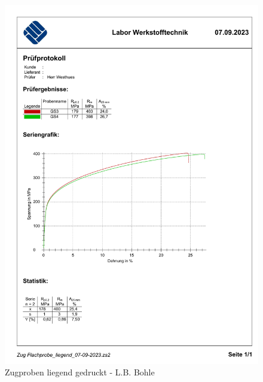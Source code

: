   \begin{figure}[ht]
    \centering
    \includegraphics[width=1\textwidth]{bilder/Zug Flachprobe_liegend_GS.pdf}
    \caption{Zugproben liegend gedruckt - L.B. Bohle} 
    \label{ZugprobenGS}
  \end{figure}
  \FloatBarrier


